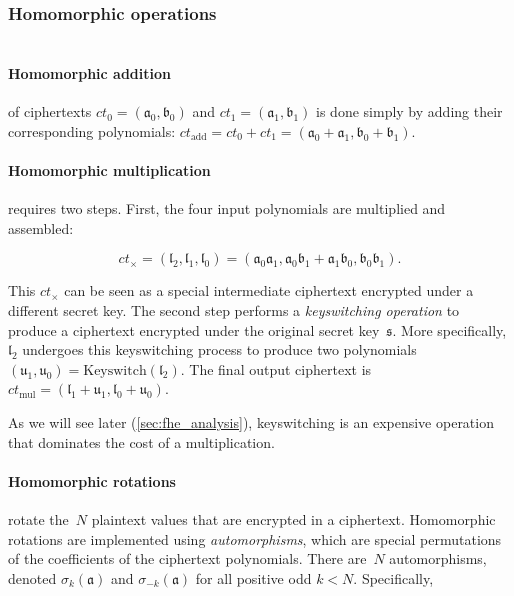 \subsubsection{Homomorphic operations}

\paragraph{\\Homomorphic addition} of ciphertexts
$ct_0 = (\mathfrak{a}_{0}, \mathfrak{b}_{0})$ and
$ct_1 = (\mathfrak{a}_{1}, \mathfrak{b}_{1})$ is done simply by adding
their corresponding polynomials:
$ct_{\text{add}} = ct_0 + ct_1 = (\mathfrak{a}_0 + \mathfrak{a}_1,
\mathfrak{b}_0 + \mathfrak{b}_1)$.

\paragraph{Homomorphic multiplication} requires two steps.
First, the four input polynomials are multiplied and assembled:

\begin{equation*}
  ct_{\times} = (\mathfrak{l}_2, \mathfrak{l}_1, \mathfrak{l}_0) = (\mathfrak{a}_0\mathfrak{a}_1,
  \mathfrak{a}_0\mathfrak{b}_1 + \mathfrak{a}_1 \mathfrak{b}_0,
  \mathfrak{b}_0\mathfrak{b}_1) .
\end{equation*}

This $ct_{\times}$ can be seen as a special intermediate ciphertext encrypted
under a different secret key. The second step performs a \emph{keyswitch\-ing
op\-era\-tion} to produce a ciphertext encrypted under the original secret
key~$\mathfrak{s}$. More specifically, $\mathfrak{l}_2$ undergoes this
keyswitching process to produce two polynomials $(\mathfrak{u}_1,
\mathfrak{u}_0) = \textrm{Keyswitch}(\mathfrak{l}_2)$.  The final output
ciphertext is $ct_{\text{mul}} = (\mathfrak{l}_1 + \mathfrak{u}_1,
\mathfrak{l}_0 + \mathfrak{u}_0)$.

As we will see later (\autoref{sec:fhe_analysis}), keyswitching is an
expensive operation that dominates the cost of a multiplication.

\paragraph{Homomorphic rotations} rotate the~$N$ plaintext values
that are encrypted in a ciphertext. Homomorphic rotations are
implemented using \emph{automorphisms}, which are special permutations of the
coefficients of the ciphertext polynomials.  There are~$N$ automorphisms,
denoted
$\sigma_k(\mathfrak{a})$ and $\sigma_{-k}(\mathfrak{a})$ for all
positive odd $k<N$. Specifically,


